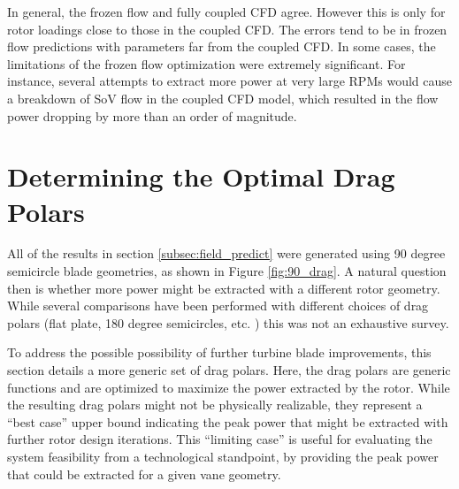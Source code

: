 In general, the frozen flow and fully coupled CFD agree. However this is
only for rotor loadings close to those in the coupled CFD. The errors
tend to be in frozen flow predictions with parameters far from the
coupled CFD. In some cases, the limitations of the frozen flow
optimization were extremely significant. For instance, several attempts
to extract more power at very large RPMs would cause a breakdown of SoV
flow in the coupled CFD model, which resulted in the flow power dropping
by more than an order of magnitude. 


\section{Determining the Optimal Drag Polars}

All of the results in section \ref{subsec:field_predict} were generated
using 90 degree semicircle blade geometries, as shown in Figure
\ref{fig:90_drag}. A natural question then is whether more power might
be extracted with a different rotor geometry. While several comparisons
have been performed with different choices of drag polars (flat plate,
180 degree semicircles, etc. ) this was not an exhaustive survey. 

To address the possible possibility of further turbine blade
improvements, this section details a more generic set of drag
polars. Here, the drag polars are generic functions and are optimized to
maximize the power extracted by the rotor. While the resulting drag
polars might not be physically  realizable, they represent a ``best
case'' upper bound indicating the peak power that might be extracted
with further rotor design iterations. This ``limiting case'' is useful
for evaluating the system feasibility from a technological standpoint,
by providing the peak power that could be extracted for a given vane
geometry. 

